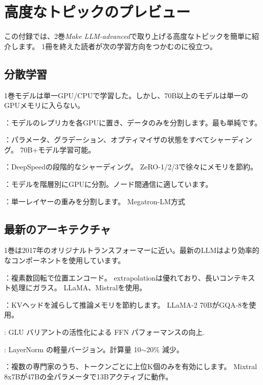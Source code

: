 \chapter{高度なトピックのプレビュー}
\label{app:advanced_preview}

この付録では、2巻\textit{Make LLM-advanced}で取り上げる高度なトピックを簡単に紹介します。 1冊を終えた読者が次の学習方向をつかむのに役立つ。

\section{分散学習}

1巻モデルは単一GP​​U/CPUで学習した。しかし、70B以上のモデルは単一のGPUメモリに入らない。

：モデルのレプリカを各GPUに置き、データのみを分割します。最も単純です。

：パラメータ、グラデーション、オプティマイザの状態をすべてシャーディング。 70B+モデル学習可能。

：DeepSpeedの段階的なシャーディング。 ZeRO-1/2/3で徐々にメモリを節約。

：モデルを階層別にGPUに分割。ノード間通信に適しています。

：単一レイヤーの重みを分割します。 Megatron-LM方式

\section{最新のアーキテクチャ}

1巻は2017年のオリジナルトランスフォーマーに近い。最新のLLMはより効率的なコンポーネントを使用しています。

：複素数回転で位置エンコード。 extrapolationは優れており、長いコンテキスト処理にガラス。 LLaMA、Mistralを使用。

：KVヘッドを減らして推論メモリを節約します。 LLaMA-2 70BがGQA-8を使用。

: GLU バリアントの活性化による FFN パフォーマンスの向上.

: LayerNorm の軽量バージョン。計算量 10$\sim$20\% 減少。

：複数の専門家のうち、トークンごとに上位K個のみを有効にします。 Mixtral 8x7Bが47Bの全パラメータで13Bアクティブに動作。

